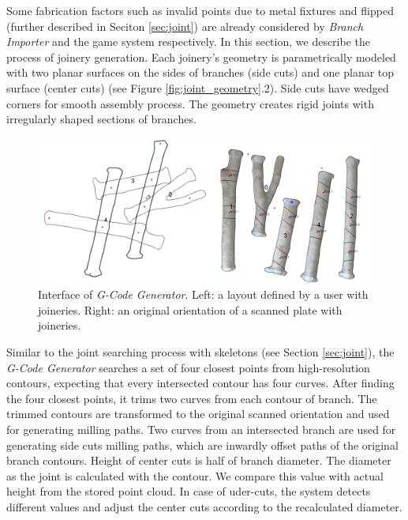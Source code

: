 Some fabrication factors such as invalid points due to metal fixtures and flipped (further described in Seciton \ref{sec:joint}) are already considered by \textit{Branch Importer} and the game system respectively.
In this section, we describe the process of joinery generation.
Each joinery's geometry is parametrically modeled with two planar surfaces on the sides of branches (side cuts) and one planar top surface (center cuts) (see Figure \ref{fig:joint_geometry}.2).
Side cuts have wedged corners for smooth assembly process.
The geometry creates rigid joints with irregularly shaped sections of branches.\\

\begin{figure}[ht]
  \begin{center}
    \includegraphics[width = 0.4\paperwidth]{images/system/joint_generator_2.png}
    \caption{Interface of \textit{G-Code Generator}. Left: a layout defined by a user with joineries. Right: an original orientation of a scanned plate with joineries. }
    \label{fig:gcode_gen}
  \end{center}
\end{figure}

Similar to the joint searching process with skeletons (see Section \ref{sec:joint}), the \textit{G-Code Generator} searches a set of four closest points from high-resolution contours, expecting that every intersected contour has four curves.
After finding the four closest points, it trims two curves from each contour of branch. 
The trimmed contours are transformed to the original scanned orientation and used for generating milling paths.
Two curves from an intersected branch are used for generating side cuts milling paths, which are inwardly offset paths of the original branch contours.
Height of center cuts is half of branch diameter.
The diameter as the joint is calculated with the contour.
We compare this value with actual height from the stored point cloud.
In case of uder-cuts, the system detects different values and adjust the center cuts according to the recalculated diameter.

